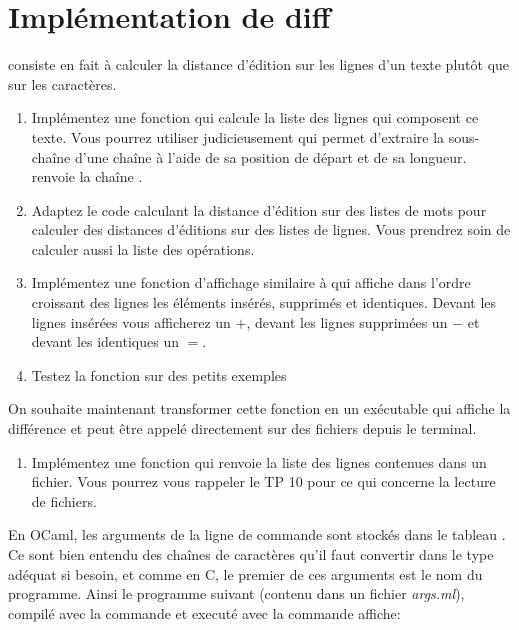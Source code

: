 \documentclass[a4paper, 10pt]{article}
\begin{document}
\section{Implémentation de diff}
 consiste en fait à calculer la distance d'édition sur les lignes d'un texte plutôt que sur les caractères.
\begin{enumerate}[resume]
\item Implémentez une fonction  qui calcule la liste des lignes qui composent ce texte. Vous pourrez utiliser judicieusement  qui permet d'extraire la sous-chaîne d'une chaîne à l'aide de sa position de départ et de sa longueur.  renvoie la chaîne .
\item Adaptez le code calculant la distance d'édition sur des listes de mots pour calculer des distances d'éditions sur des listes de lignes. Vous prendrez soin de calculer aussi la liste des opérations.
\item Implémentez une fonction d'affichage similaire à  qui affiche dans l'ordre croissant des lignes les éléments insérés, supprimés et identiques. Devant les lignes insérées vous afficherez un \(+\), devant les lignes supprimées un \(-\) et devant les identiques un \(=\).
\item Testez la fonction sur des petits exemples
\end{enumerate}
On souhaite maintenant transformer cette fonction en un exécutable qui affiche la différence et peut être appelé directement sur des fichiers depuis le terminal.
\begin{enumerate}[resume]
\item Implémentez une fonction  qui renvoie la liste des lignes contenues dans un fichier. Vous pourrez vous rappeler le TP 10 pour ce qui concerne la lecture de fichiers.
\end{enumerate}
En OCaml, les arguments de la ligne de commande sont stockés dans le tableau . Ce sont bien entendu des chaînes de caractères qu'il faut convertir dans le type adéquat si besoin, et comme en C, le premier de ces arguments est le nom du programme. Ainsi le programme suivant (contenu dans un fichier \emph{args.ml}), compilé avec la commande  et executé avec la commande  affiche:
\end{document}
